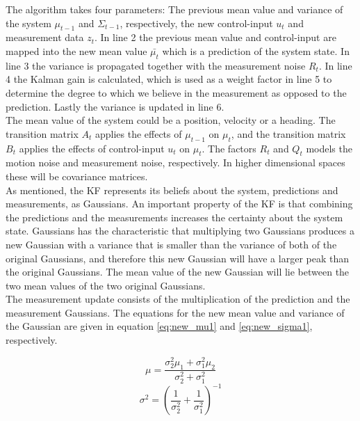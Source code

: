 The algorithm takes four parameters: The previous mean value and variance of the system $\mu_{t-1}$ and $\Sigma_{t-1}$, respectively, the new control-input $u_{t}$ and measurement data $z_{t}$. In line 2 the previous mean value and control-input are mapped into the new mean value $\bar{\mu_{t}}$ which is a prediction of the system state. In line 3 the variance is propagated together with the measurement noise $R_{t}$. In line 4 the Kalman gain is calculated, which is used as a weight factor in line 5 to determine the degree to which we believe in the measurement as opposed to the prediction. Lastly the variance is updated in line 6.\\

The mean value of the system could be a position, velocity or a heading. The transition matrix $A_{t}$ applies the effects of $\mu_{t-1}$ on $\mu_{t}$, and the transition matrix $B_{t}$ applies the effects of control-input $u_{t}$ on $\mu_{t}$. The factors $R_{t}$ and $Q_{t}$ models the motion noise and measurement noise, respectively. In higher dimensional spaces these will be covariance matrices.\\

As mentioned, the KF represents its beliefs about the system, predictions and measurements, as Gaussians. An important property of the KF is that combining the predictions and the measurements increases the certainty about the system state. Gaussians has the characteristic that multiplying two Gaussians produces a new Gaussian with a variance that is smaller than the variance of both of the original Gaussians, and therefore this new Gaussian will have a larger peak than the original Gaussians. The mean value of the new Gaussian will lie between the two mean values of the two original Gaussians. \\

The measurement update consists of the multiplication of the prediction and the measurement Gaussians. The equations for the new mean value and variance of the Gaussian are given in equation \ref{eq:new_mu1} and \ref{eq:new_sigma1}, respectively.

\begin{equation}
\label{eq:new_mu1}
\mu = \dfrac{\sigma_{2}^2\mu_{1} + \sigma_{1}^2\mu_{2}}{\sigma_{2}^2 + \sigma_{1}^2}
\end{equation}
\begin{equation}
\label{eq:new_sigma1}
\sigma^2 = \left(\dfrac{1}{\sigma_{2}^2} + \dfrac{1}{\sigma_{1}^2}\right)^{-1}
\end{equation}

